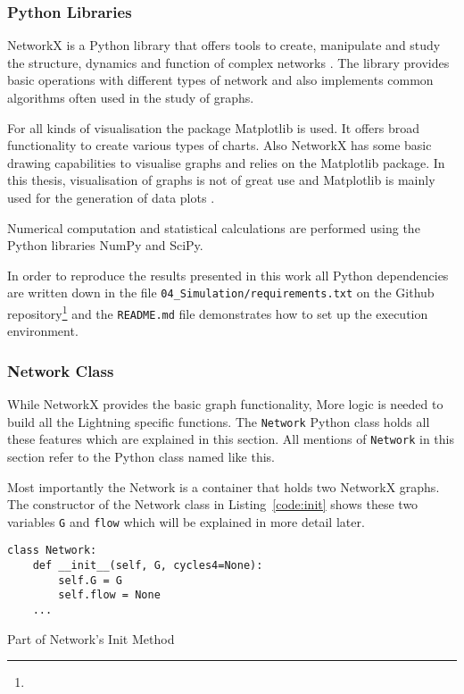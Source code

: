 \documentclass[final]{fhnwreport}       %
\begin{document}
\subsubsection{Python Libraries}
NetworkX is a Python library that offers tools to create, manipulate and study the structure, dynamics and function of complex networks \citep{al-taie_python_2017}. The library provides basic operations with different types of network and also implements common algorithms often used in the study of graphs.  

For all kinds of visualisation the package Matplotlib is used. It offers broad functionality to create various types of charts. Also NetworkX has some basic drawing capabilities to visualise graphs and relies on the Matplotlib package. In this thesis, visualisation of graphs is not of great use and Matplotlib is mainly used for the generation of data plots \citep{al-taie_python_2017}.

Numerical computation and statistical calculations are performed using the Python libraries NumPy and SciPy. 

In order to reproduce the results presented in this work all Python dependencies are written down in the file \texttt{04\_Simulation/requirements.txt} on the Github repository\footnote{\github} and the \texttt{README.md} file demonstrates how to set up the execution environment.

\subsubsection{Network Class}
While NetworkX provides the basic graph functionality, More logic is needed to build all the Lightning specific functions. The \texttt{Network} Python class holds all these features which are explained in this section. All mentions of \texttt{Network} in this section refer to the Python class named like this.

Most importantly the Network is a container that holds two NetworkX graphs. The constructor of the Network class in Listing~\ref{code:init} shows these two variables \texttt{G} and \texttt{flow} which will be explained in more detail later.

\begin{listing}[H]
  \begin{verbatim}
class Network:
    def __init__(self, G, cycles4=None):
        self.G = G
        self.flow = None
	...
  \end{verbatim}
  \caption{Part of Network's Init Method}
  \label{code:init}
\end{listing}
\end{document}
